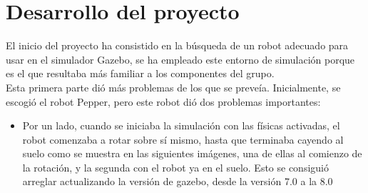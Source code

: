 \section{Desarrollo del proyecto}
El inicio del proyecto ha consistido en la búsqueda de un robot adecuado para usar en el simulador Gazebo, se ha empleado este entorno de simulación porque es el que resultaba más familiar a los componentes del grupo.\\
 
Esta primera parte dió más problemas de los que se preveía. 
Inicialmente, se escogió el robot Pepper, pero este robot dió dos problemas importantes:
 
\begin{itemize}
  \item Por un lado, cuando se iniciaba la simulación con las físicas activadas, el robot comenzaba a rotar sobre sí mismo, hasta que terminaba cayendo al suelo como se muestra en las siguientes imágenes, una de ellas al comienzo de la rotación, y la segunda con el robot ya en el suelo. Esto se consiguió arreglar actualizando la versión de gazebo, desde la versión 7.0 a la 8.0
       

\end{itemize}

